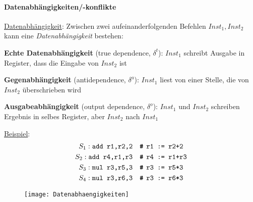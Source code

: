 \paragraph{Datenabhängigkeiten/-konflikte}
\begin{items}
  \item \underline{Datenabhängigkeit}: Zwischen zwei aufeinanderfolgenden Befehlen \( Inst_1, Inst_2 \) kann eine \emph{Datenabhängigkeit} bestehen:
  \begin{enumeration}
    \item \textbf{Echte Datenabhängigkeit} (true dependence, \( \delta^t \)): \( Inst_1 \) schreibt Ausgabe in Register, dass die Eingabe von \( Inst_2 \) ist
    \item \textbf{Gegenabhängigkeit} (antidependence, \( \delta^a \)): \( Inst_1 \) liest von einer Stelle, die von \( Inst_2 \) überschrieben wird
    \item \textbf{Ausgabeabhängigkeit} (output dependence, \( \delta^o \)): \( Inst_1 \) und \( Inst_2 \) schreiben Ergebnis in selbes Register, aber \( Inst_2 \) nach \( Inst_1 \)
  \end{enumeration}

  \item \underline{Beispiel}:
  \begin{align*}
    S_1: \text{\code{add r1,r2,2}} &\quad \text{\code{# r1 := r2+2}} \\
    S_2: \text{\code{add r4,r1,r3}} &\quad \text{\code{# r4 := r1+r3}} \\
    S_3: \text{\code{mul r3,r5,3}} &\quad \text{\code{# r3 := r5*3}} \\
    S_4: \text{\code{mul r3,r6,3}} &\quad \text{\code{# r3 := r6*3}}
  \end{align*}
  \begin{figure}[H]\centering\label{Datenabhaengigkeiten}\texttt{[image: Datenabhaengigkeiten]}\end{figure}


\end{items}
